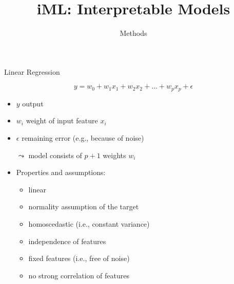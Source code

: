 \documentclass[aspectratio=169]{../latex_main/tntbeamer}  %
\title[Introduction]{iML: Interpretable Models}
\subtitle{Methods}
\begin{document}
	
	\maketitle


\begin{frame}[c]{Linear Regression}

    $$y = w_0 + w_1 x_1 + w_2 x_2 + \ldots + w_p x_p + \epsilon $$

    \begin{itemize}
        \item $y$ output
        \item $w_i$ weight of input feature $x_i$
        \item $\epsilon$ remaining error (e.g., because of noise)
        \item[$\leadsto$] model consists of $p+1$ weights $w_i$
        \item Properties and assumptions:
        \begin{itemize}
            \item linear
            \item normality assumption of the target
            \item homoscedastic (i.e., constant variance)
            \item independence of features
            \item fixed features (i.e., free of noise)
            \item no strong correlation of features
        \end{itemize} 
    \end{itemize}

\end{frame}

\end{document}
